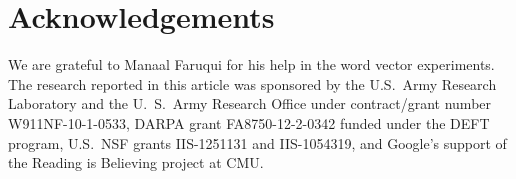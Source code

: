 \documentclass[11pt]{article}
\begin{document}
\small
\section*{Acknowledgements}
We are grateful to Manaal Faruqui for his help in the word vector experiments.
The research reported in this article was sponsored by the U.S.~Army Research
Laboratory and the U.~S.~Army Research Office under contract/grant number
W911NF-10-1-0533, DARPA grant FA8750-12-2-0342 funded under the DEFT
program, U.S.~NSF grants IIS-1251131 and IIS-1054319, and Google's
support of the Reading is Believing project at CMU.




\end{document}

